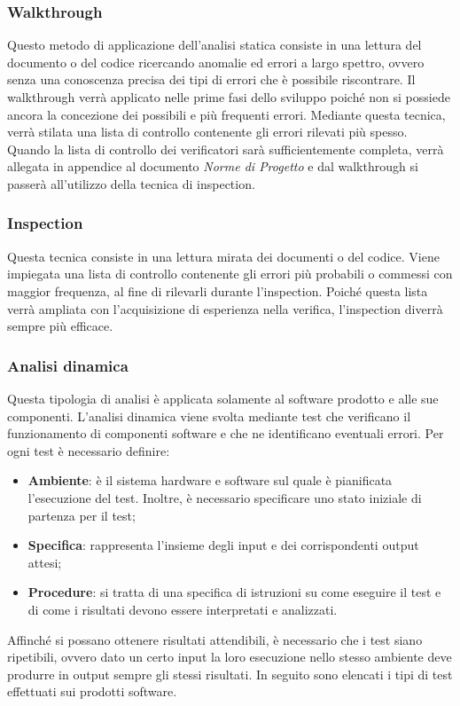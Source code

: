 \subsubsection{Walkthrough}
Questo metodo di applicazione dell’analisi statica consiste in una lettura del documento o del codice ricercando anomalie ed errori a largo spettro, ovvero senza una conoscenza precisa dei tipi di errori che è possibile riscontrare. Il walkthrough verrà applicato nelle prime fasi dello sviluppo poiché non si possiede ancora la concezione dei possibili e più frequenti errori. Mediante questa tecnica, verrà stilata una lista di controllo contenente gli errori rilevati più spesso. Quando la lista di controllo dei verificatori sarà sufficientemente completa, verrà allegata in appendice al documento \textit{Norme di Progetto} e dal walkthrough si passerà all’utilizzo della tecnica di inspection.

\subsubsection{Inspection}
Questa tecnica consiste in una lettura mirata dei documenti o del codice. Viene impiegata una lista di controllo contenente gli errori più probabili o commessi con maggior frequenza, al fine di rilevarli durante l’inspection. Poiché questa lista verrà ampliata con l’acquisizione di esperienza nella verifica, l’inspection diverrà sempre più efficace.

\subsubsection{Analisi dinamica}
Questa tipologia di analisi è applicata solamente al software prodotto e alle sue componenti. L’analisi dinamica viene svolta mediante test che verificano il funzionamento di componenti software e che ne identificano eventuali errori. Per ogni test è necessario definire:
\begin{itemize}
\item \textbf{Ambiente}: è il sistema hardware e software sul quale è pianificata l’esecuzione del test. Inoltre, è necessario specificare uno stato iniziale di partenza per il test;
\item \textbf{Specifica}: rappresenta l’insieme degli input e dei corrispondenti output attesi;
\item \textbf{Procedure}: si tratta di una specifica di istruzioni su come eseguire il test e di come i risultati devono essere interpretati e analizzati.
\end{itemize}
Affinché si possano ottenere risultati attendibili, è necessario che i test siano ripetibili, ovvero dato un certo input la loro esecuzione nello stesso ambiente deve produrre in output sempre gli stessi risultati. In seguito sono elencati i tipi di test effettuati sui prodotti software.

